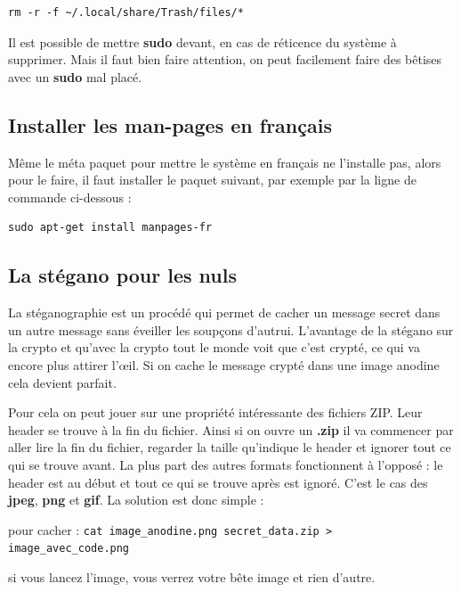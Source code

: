 \documentclass[a4paper,twoside]{article}
\begin{document}
\begin{verbatim}
rm -r -f ~/.local/share/Trash/files/*
\end{verbatim}

\begin{remarque}
Il est possible de mettre \textbf{sudo} devant, en cas de réticence du système à supprimer. Mais il faut bien faire attention, on peut facilement faire des bêtises avec un \textbf{sudo} mal placé.
\end{remarque}



\subsection{Installer les man-pages en français}
Même le méta paquet pour mettre le système en français ne l'installe pas, alors pour le faire, il faut installer le paquet suivant, par exemple par la ligne de commande ci-dessous :

\begin{verbatim}
sudo apt-get install manpages-fr
\end{verbatim}






\subsection{La stégano pour les nuls}
La stéganographie est un procédé qui permet de cacher un message \og secret \fg   dans un autre message sans éveiller les soupçons d'autrui. L'avantage de la stégano sur la crypto et qu'avec la crypto tout le monde voit que c'est crypté, ce qui va encore plus attirer l'\oe il. Si on cache le message crypté dans une image anodine cela devient parfait.

Pour cela on peut jouer sur une propriété intéressante des fichiers ZIP. Leur \og header \fg  se trouve à la fin du fichier. Ainsi si on ouvre un \textbf{.zip} il va commencer par aller lire la fin du fichier, regarder la taille qu'indique le header et ignorer tout ce qui se trouve avant. La plus part des autres formats fonctionnent à l'opposé : le header est au début et tout ce qui se trouve après est ignoré. C'est le cas des \textbf{jpeg}, \textbf{png} et \textbf{gif}. La solution est donc simple :

pour \og cacher \fg   : \verb|cat image_anodine.png secret_data.zip > image_avec_code.png|

si vous \og lancez \fg   l'image, vous verrez votre bête image et rien d'autre.
\end{document}

